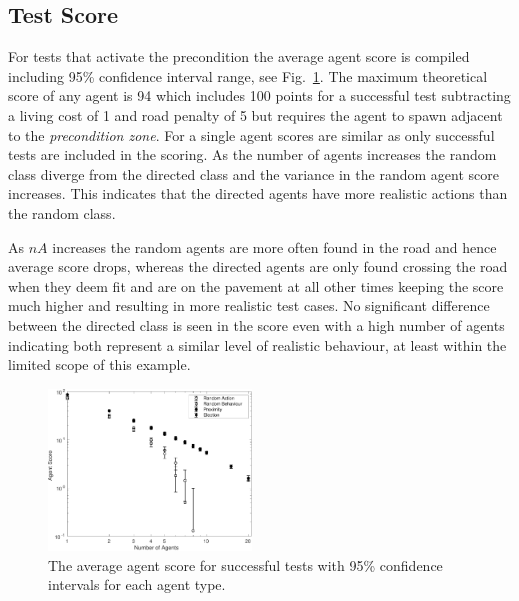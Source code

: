 \documentclass[letterpaper, 10 pt, journal, twoside]{IEEEtran}
\begin{document}
\subsection{Test Score} \label{testscore}
For tests that activate the precondition the average agent score is compiled including 95\% confidence interval range, see Fig.~\ref{AgentScore}. The maximum theoretical score of any agent is 94 which includes 100 points for a successful test subtracting a living cost of 1 and road penalty of 5 but requires the agent to spawn adjacent to the \textit{precondition zone}. For a single agent scores are similar as only successful tests are included in the scoring. As the number of agents increases the random class diverge from the directed class and the variance in the random agent score increases. This indicates that the directed agents have more realistic actions than the random class. 


As $nA$ increases the random agents are more often found in the road and hence average score drops, whereas the directed agents are only found crossing the road when they deem fit and are on the pavement at all other times keeping the score much higher and resulting in more realistic test cases.
%
%
%
No significant difference between the directed class is seen in the score even with a high number of agents indicating both represent a similar level of realistic behaviour, at least within the limited scope of this example.


\begin{figure}[!t]
	\centering
\includegraphics[width=0.48\textwidth]{AgentScore.pdf}
	\caption{The average agent score for successful tests with 95\% confidence intervals for each agent type.}%
	\label{AgentScore}
\end{figure}
\end{document}
